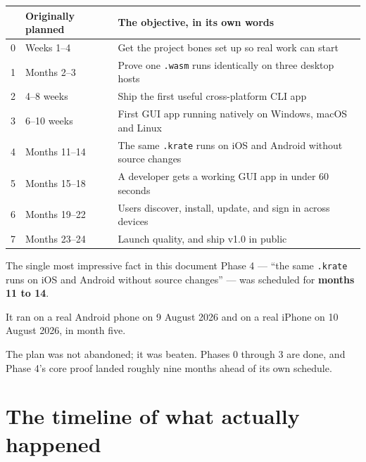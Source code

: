 \documentclass[11pt,a4paper]{report}
\begin{document}
\begin{center}
\begin{longtable}{clp{7.1cm}}
\toprule
& \textbf{Originally planned} & \textbf{The objective, in its own words} \\
\midrule
\endhead
0 & Weeks 1--4 & Get the project bones set up so real work can start \\
1 & Months 2--3 & Prove one \texttt{.wasm} runs identically on three desktop hosts \\
2 & 4--8 weeks & Ship the first useful cross-platform CLI app \\
3 & 6--10 weeks & First GUI app running natively on Windows, macOS and Linux \\
4 & Months 11--14 & The same \texttt{.krate} runs on iOS and Android without source changes \\
5 & Months 15--18 & A developer gets a working GUI app in under 60 seconds \\
6 & Months 19--22 & Users discover, install, update, and sign in across devices \\
7 & Months 23--24 & Launch quality, and ship v1.0 in public \\
\bottomrule
\end{longtable}
\end{center}

\begin{factbox}{The single most impressive fact in this document}
Phase 4 --- ``the same \texttt{.krate} runs on iOS and Android without
source changes'' --- was scheduled for \textbf{months 11 to 14}.

It ran on a real Android phone on 9 August 2026 and on a real iPhone on
10 August 2026, in month five.

The plan was not abandoned; it was beaten. Phases 0 through 3 are done, and
Phase 4's core proof landed roughly nine months ahead of its own schedule.
\end{factbox}

\section{The timeline of what actually happened}
\end{document}
